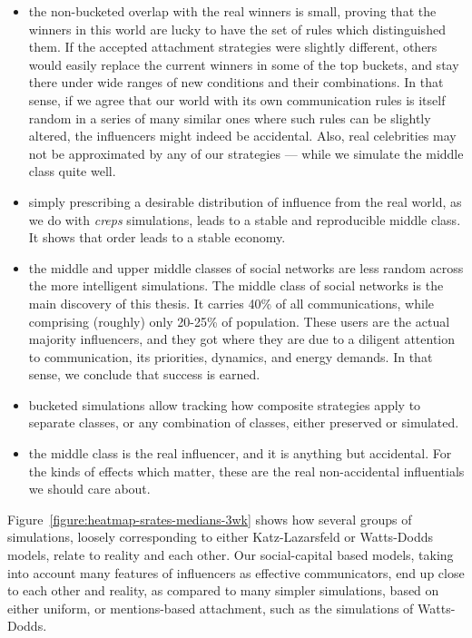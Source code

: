 \documentclass[10pt,oneside]{memoir}
\begin{document}
\begin{Spacing}{2}
\begin{itemize}
\item the non-bucketed overlap with the real winners is small, proving that the winners in this world are lucky to have the set of rules which distinguished them.  If the accepted attachment strategies were slightly different, others would easily replace the current winners in some of the top buckets, and stay there under wide ranges of new conditions and their combinations.  In that sense, if we agree that our world with its own communication rules is itself random in a series of many similar ones where such rules can be slightly altered, the influencers might indeed be accidental.   Also, real celebrities may not be approximated by any of our strategies --- while we simulate the middle class quite well.




\item simply prescribing a desirable distribution of influence from the real world, as we do with {\itshape creps} simulations, leads to a stable and reproducible middle class.  It shows that order leads to a stable economy.




\item the middle and upper middle classes of social networks are less random across the more intelligent simulations.  The middle class of social networks is the main discovery of this thesis.  It carries 40\% of all communications, while comprising (roughly) only 20-25\% of population.  These users are the actual majority influencers, and they got where they are due to a diligent attention to communication, its priorities, dynamics, and energy demands.  In that sense, we conclude that success is earned.




\item bucketed simulations allow tracking how composite strategies apply to separate classes, or any combination of classes, either preserved or simulated.




\item the middle class is the real influencer, and it is anything but accidental.  For the kinds of effects which matter, these are the real non-accidental influentials we should care about.



\end{itemize}

Figure~\ref{figure:heatmap-srates-medians-3wk} shows how several groups of simulations, loosely corresponding to either Katz-Lazarsfeld or Watts-Dodds models, relate to reality and each other.  Our social-capital based models, taking into account many features of influencers as effective communicators, end up close to each other and reality, as compared to many simpler simulations, based on either uniform, or mentions-based attachment, such as the simulations of Watts-Dodds.




\end{Spacing}
\end{document}
